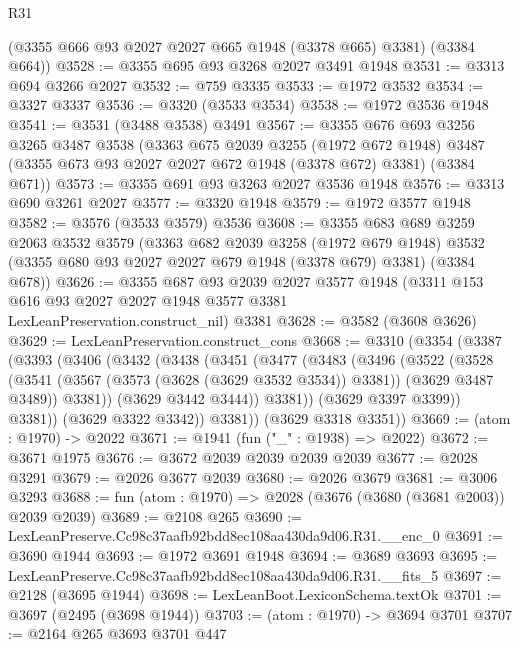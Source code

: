 \begin{lexlean}{R31}
\begin{coremodule}
      (@3355 @666 @93 @2027 @2027 @665 @1948 (@3378 @665) @3381)
      (@3384 @664))
@3528 := @3355 @695 @93 @3268 @2027 @3491 @1948
@3531 := @3313 @694 @3266 @2027
@3532 := @759 @3335
@3533 := @1972 @3532
@3534 := @3327 @3337
@3536 := @3320 (@3533 @3534)
@3538 := @1972 @3536 @1948
@3541 := @3531 (@3488 @3538) @3491
@3567 := @3355
    @676
    @693
    @3256
    @3265
    @3487
    @3538
    (@3363
      @675
      @2039
      @3255
      (@1972 @672 @1948)
      @3487
      (@3355 @673 @93 @2027 @2027 @672 @1948 (@3378 @672) @3381)
      (@3384 @671))
@3573 := @3355 @691 @93 @3263 @2027 @3536 @1948
@3576 := @3313 @690 @3261 @2027
@3577 := @3320 @1948
@3579 := @1972 @3577 @1948
@3582 := @3576 (@3533 @3579) @3536
@3608 := @3355
    @683
    @689
    @3259
    @2063
    @3532
    @3579
    (@3363
      @682
      @2039
      @3258
      (@1972 @679 @1948)
      @3532
      (@3355 @680 @93 @2027 @2027 @679 @1948 (@3378 @679) @3381)
      (@3384 @678))
@3626 := @3355
    @687
    @93
    @2039
    @2027
    @3577
    @1948
    (@3311 @153 @616 @93 @2027 @2027 @1948 @3577 @3381 LexLeanPreservation.construct_nil)
    @3381
@3628 := @3582 (@3608 @3626)
@3629 := LexLeanPreservation.construct_cons
@3668 := @3310
    (@3354
      (@3387
        (@3393
          (@3406
            (@3432
              (@3438
                (@3451
                  (@3477
                    (@3483
                      (@3496
                        (@3522
                          (@3528
                            (@3541
                              (@3567 (@3573 (@3628 (@3629 @3532 @3534)) @3381))
                              (@3629 @3487 @3489))
                            @3381))
                        (@3629 @3442 @3444))
                      @3381))
                  (@3629 @3397 @3399))
                @3381))
            (@3629 @3322 @3342))
          @3381))
      (@3629 @3318 @3351))
@3669 := (atom : @1970) -> @2022
@3671 := @1941 (fun ("_" : @1938) => @2022)
@3672 := @3671 @1975
@3676 := @3672 @2039 @2039 @2039 @2039
@3677 := @2028 @3291
@3679 := @2026 @3677 @2039
@3680 := @2026 @3679
@3681 := @3006 @3293
@3688 := fun (atom : @1970) => @2028 (@3676 (@3680 (@3681 @2003)) @2039 @2039)
@3689 := @2108 @265
@3690 := LexLeanPreserve.Cc98c37aafb92bdd8ec108aa430da9d06.R31.__enc_0
@3691 := @3690 @1944
@3693 := @1972 @3691 @1948
@3694 := @3689 @3693
@3695 := LexLeanPreserve.Cc98c37aafb92bdd8ec108aa430da9d06.R31.__fits_5
@3697 := @2128 (@3695 @1944)
@3698 := LexLeanBoot.LexiconSchema.textOk
@3701 := @3697 (@2495 (@3698 @1944))
@3703 := (atom : @1970) -> @3694 @3701
@3707 := @2164 @265 @3693 @3701 @447

\end{coremodule}
\end{lexlean}
